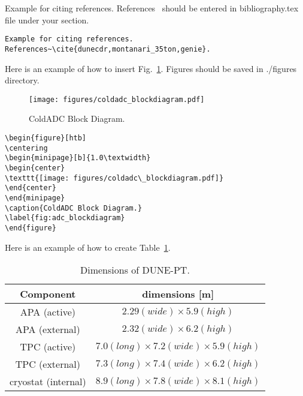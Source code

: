 \label{sec:appendix}

Example for citing references. References~\cite{dunecdr,montanari_35ton,genie} should be entered in bibliography.tex file under your section.
\begin{verbatim}
Example for citing references. References~\cite{dunecdr,montanari_35ton,genie}.
\end{verbatim}

\vspace{0.5in}


Here is an example of how to insert Fig.~\ref{fig:adc_blockdiagram}. Figures should be saved in ./figures directory.

\begin{figure}[htb]
\centering
\begin{minipage}[b]{1.0\textwidth}
\begin{center}
\texttt{[image: figures/coldadc\_blockdiagram.pdf]}
\end{center}
\end{minipage}
\caption{ColdADC Block Diagram.}
\label{fig:adc_blockdiagram}
\end{figure}

\begin{verbatim}
\begin{figure}[htb]
\centering
\begin{minipage}[b]{1.0\textwidth}
\begin{center}
\texttt{[image: figures/coldadc\_blockdiagram.pdf]}
\end{center}
\end{minipage}
\caption{ColdADC Block Diagram.}
\label{fig:adc_blockdiagram}
\end{figure}
\end{verbatim}


\newpage
Here is an example of how to create Table~\ref{tab:TPC-dim}.

\begin{table}[h]
\centering
\begin{tabular}{|c|c|}
\hline
\textbf{ Component } & dimensions [m]  \\ \hline \hline
APA  (active) &  $2.29 (wide) \times 5.9 (high)$ \\ \hline
APA  (external) &  $2.32 (wide) \times 6.2 (high)$ \\ \hline
TPC (active)       & $7.0 (long) \times 7.2 (wide) \times 5.9 (high)$  \\ \hline
TPC (external)       & $7.3 (long) \times 7.4 (wide) \times 6.2 (high)$  \\ \hline
cryostat (internal) &  $8.9 (long) \times 7.8 (wide) \times 8.1 (high)$  \\ \hline
\end{tabular}
\caption{Dimensions of DUNE-PT.}
\label{tab:TPC-dim}
\end{table}

